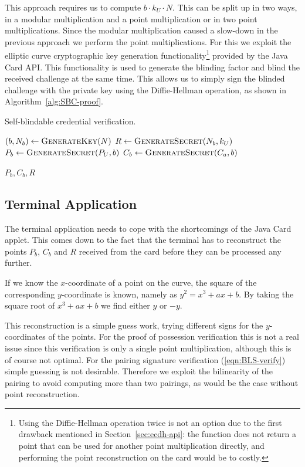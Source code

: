 This approach requires us to compute $b \cdot k_U \cdot N$. This can be split
up in two ways, in a modular multiplication and a point multiplication or in two
point multiplications. Since the modular multiplication caused a slow-down in
the previous approach we perform the point multiplications. For this we exploit
the elliptic curve cryptographic key generation functionality\footnote{Using
the Diffie-Hellman operation twice is not an option due to the first drawback
mentioned in Section~\ref{sec:ecdh-api}: the function does not return a point
that can be used for another point multiplication directly, and performing the
point reconstruction on the card would be to costly.} provided by the Java Card
API. This functionality is used to generate the blinding factor and blind the
received challenge at the same time. This allows us to simply sign the blinded
challenge with the private key using the Diffie-Hellman operation, as shown in
Algorithm~\ref{alg:SBC-proof}.

\begin{algorithm}
  \caption{Self-blindable credential verification.}
  \label{alg:SBC-proof}
  \addtolength{\baselineskip}{1mm}
  \begin{algorithmic}[1]
      \State $(b, N_b) \gets \Call{GenerateKey}{N}$
      \State $R \gets \Call{GenerateSecret}{N_b, k_U}$
      \State $P_b \gets \Call{GenerateSecret}{P_U, b}$
      \State $C_b \gets \Call{GenerateSecret}{C_a, b}$

      \Return $P_b, C_b, R$
    \EndFunction
  \end{algorithmic}
\end{algorithm}


\subsection{Terminal Application}

The terminal application needs to cope with the shortcomings of the Java Card
applet. This comes down to the fact that the terminal has to reconstruct the
points $P_b$, $C_b$ and $R$ received from the card before they can be processed
any further.

If we know the $x$-coordinate of a point on the curve, the square of the
corresponding $y$-coordinate is known, namely as $y^{2} = x^{3} + ax + b$.
By taking the square root of $x^{3} + ax + b$ we find either $y$ or $-y$.

This reconstruction is a simple guess work, trying different signs for the
$y$-coordinates of the points. For the proof of possession verification this is
not a real issue since this verification is only a single point multiplication,
although this is of course not optimal. For the pairing signature verification
(\ref{eqn:BLS-verify}) simple guessing is not desirable. Therefore we exploit
the bilinearity of the pairing to avoid computing more than two pairings, as
would be the case without point reconstruction.

